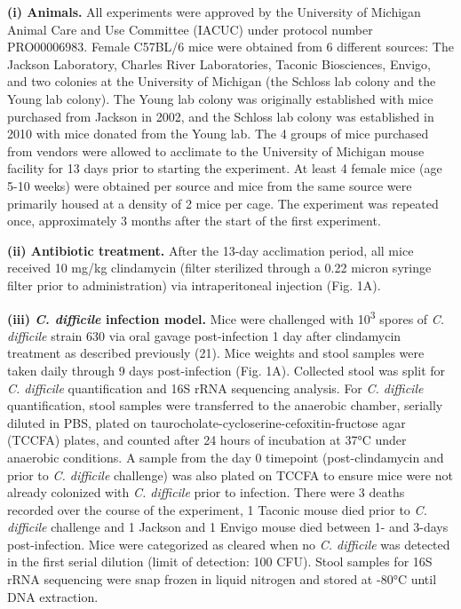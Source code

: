 \documentclass[
  11pt,
]{article}
\begin{document}
\textbf{(i) Animals.} All experiments were approved by the University of
Michigan Animal Care and Use Committee (IACUC) under protocol number
PRO00006983. Female C57BL/6 mice were obtained from 6 different sources:
The Jackson Laboratory, Charles River Laboratories, Taconic Biosciences,
Envigo, and two colonies at the University of Michigan (the Schloss lab
colony and the Young lab colony). The Young lab colony was originally
established with mice purchased from Jackson in 2002, and the Schloss
lab colony was established in 2010 with mice donated from the Young lab.
The 4 groups of mice purchased from vendors were allowed to acclimate to
the University of Michigan mouse facility for 13 days prior to starting
the experiment. At least 4 female mice (age 5-10 weeks) were obtained
per source and mice from the same source were primarily housed at a
density of 2 mice per cage. The experiment was repeated once,
approximately 3 months after the start of the first experiment.

\textbf{(ii) Antibiotic treatment.} After the 13-day acclimation period,
all mice received 10 mg/kg clindamycin (filter sterilized through a 0.22
micron syringe filter prior to administration) via intraperitoneal
injection (Fig. 1A).

\textbf{(iii) \emph{C. difficile} infection model.} Mice were challenged
with 10\textsuperscript{3} spores of \emph{C. difficile} strain 630 via
oral gavage post-infection 1 day after clindamycin treatment as
described previously (21). Mice weights and stool samples were taken
daily through 9 days post-infection (Fig. 1A). Collected stool was split
for \emph{C. difficile} quantification and 16S rRNA sequencing analysis.
For \emph{C. difficile} quantification, stool samples were transferred
to the anaerobic chamber, serially diluted in PBS, plated on
taurocholate-cycloserine-cefoxitin-fructose agar (TCCFA) plates, and
counted after 24 hours of incubation at 37°C under anaerobic conditions.
A sample from the day 0 timepoint (post-clindamycin and prior to
\emph{C. difficile} challenge) was also plated on TCCFA to ensure mice
were not already colonized with \emph{C. difficile} prior to infection.
There were 3 deaths recorded over the course of the experiment, 1
Taconic mouse died prior to \emph{C. difficile} challenge and 1 Jackson
and 1 Envigo mouse died between 1- and 3-days post-infection. Mice were
categorized as cleared when no \emph{C. difficile} was detected in the
first serial dilution (limit of detection: 100 CFU). Stool samples for
16S rRNA sequencing were snap frozen in liquid nitrogen and stored at
-80°C until DNA extraction.
\end{document}
